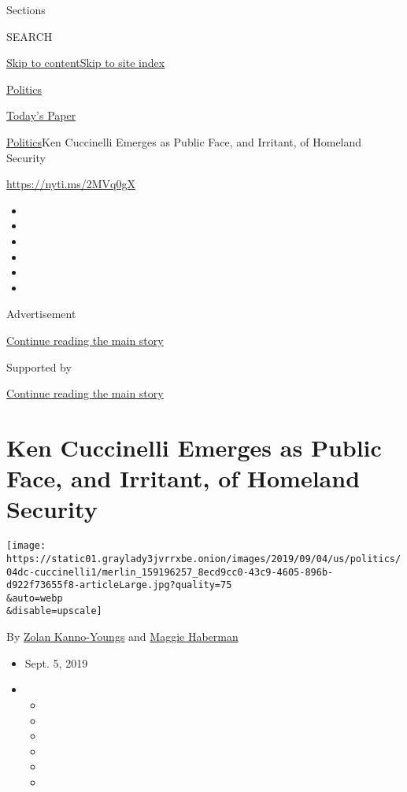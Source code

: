 Sections

SEARCH

\protect\hyperlink{site-content}{Skip to
content}\protect\hyperlink{site-index}{Skip to site index}

\href{https://www.nytimes3xbfgragh.onion/section/politics}{Politics}

\href{https://myaccount.nytimes3xbfgragh.onion/auth/login?response_type=cookie\&client_id=vi}{}

\href{https://www.nytimes3xbfgragh.onion/section/todayspaper}{Today's
Paper}

\href{/section/politics}{Politics}\textbar{}Ken Cuccinelli Emerges as
Public Face, and Irritant, of Homeland Security

\url{https://nyti.ms/2MVq0gX}

\begin{itemize}
\item
\item
\item
\item
\item
\item
\end{itemize}

Advertisement

\protect\hyperlink{after-top}{Continue reading the main story}

Supported by

\protect\hyperlink{after-sponsor}{Continue reading the main story}

\hypertarget{ken-cuccinelli-emerges-as-public-face-and-irritant-of-homeland-security}{%
\section{Ken Cuccinelli Emerges as Public Face, and Irritant, of
Homeland
Security}\label{ken-cuccinelli-emerges-as-public-face-and-irritant-of-homeland-security}}

\texttt{[image: https://static01.graylady3jvrrxbe.onion/images/2019/09/04/us/politics/04dc-cuccinelli1/merlin\_159196257\_8ecd9cc0-43c9-4605-896b-d922f73655f8-articleLarge.jpg?quality=75\\\&auto=webp\\\&disable=upscale]}

By \href{https://www.nytimes3xbfgragh.onion/by/zolan-kanno-youngs}{Zolan
Kanno-Youngs} and
\href{https://www.nytimes3xbfgragh.onion/by/maggie-haberman}{Maggie
Haberman}

\begin{itemize}
\item
  Sept. 5, 2019
\item
  \begin{itemize}
  \item
  \item
  \item
  \item
  \item
  \item
  \end{itemize}
\end{itemize}

